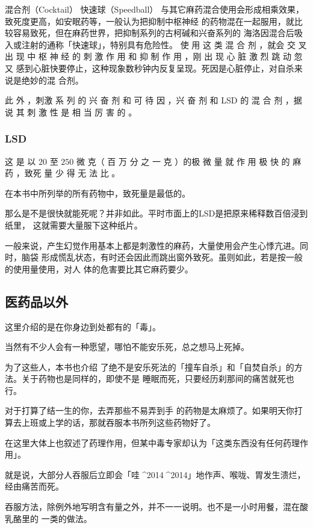 \documentclass[UTF8]{ctexart}
\begin{document}
混合剂（Cocktail） 快速球（Speedball） 与其它麻药混合使用会形成相乘效果，致死度更高，如安眠药等，一般认为把抑制中枢神经 的药物混在一起服用，就比较容易致死，但在麻药世界，把抑制系列的古柯碱和兴奋系列的 海洛因混合后吸入或注射的通称「快速球」，特别具有危险性。 使 用 这 类 混 合 剂 ，就会 交 叉 出 现 中 枢 神 经 的 刺 激 作 用 和 抑 制 作 用 ，刚 出 现 心 脏 激 烈 跳 动 忽 又 感到心脏快要停止，这种现象数秒钟内反复呈现。死因是心脏停止，对自杀来说是绝妙的混 合剂。

此 外 ，刺激 系 列 的 兴 奋 剂 和 可 待 因 ，兴 奋 剂 和 LSD 的 混 合 剂 ，据说 其 刺 激 性 是 相 当 厉 害 的 。

\subsubsection*{LSD}

这 是 以 $20$ 至 $250$ 微 克（ 百 万 分 之 一 克 ）的极 微 量 就 作 用 极 快 的 麻 药 ，致死 量 少 得 无 法 比 。

在本书中所列举的所有药物中，致死量是最低的。

那么是不是很快就能死呢？并非如此。平时市面上的LSD是把原来稀释数百倍浸到纸里，
这就需要大量服下这种纸片。

一般来说，产生幻觉作用基本上都是刺激性的麻药，大量使用会产生心悸亢进。同时，脑袋
形成慌乱状态，有时还会因此而跳出窗外致死。虽则如此，若是按一般的使用量使用，对人
体的危害要比其它麻药要少。

\subsection{医药品以外}

这里介绍的是在你身边到处都有的「毒」。

当然有不少人会有一种愿望，哪怕不能安乐死，总之想马上死掉。

为了这些人，本书也介绍
了绝不是安乐死法的「撞车自杀」和「自焚自杀」的方法。关于药物也是同样的，即使不是
睡眠而死，只要经历刹那间的痛苦就死也行。

对于打算了结一生的你，去弄那些不易弄到手
的药物是太麻烦了。如果明天你打算去上班或上学的话，那就吞服本书所列这些药物好了。

在这里大体上也叙述了药理作用，但某中毒专家却认为「这类东西没有任何药理作用」。

就是说，大部分人吞服后立即会「哇^^^^2014^^^^2014」地作声、喉咙、胃发生溃烂，经由痛苦而死。

吞服方法，除例外地写明含有量之外，并不一一说明。也不是一小时用餐，混在酸乳酪里的
一类的做法。
\end{document}
